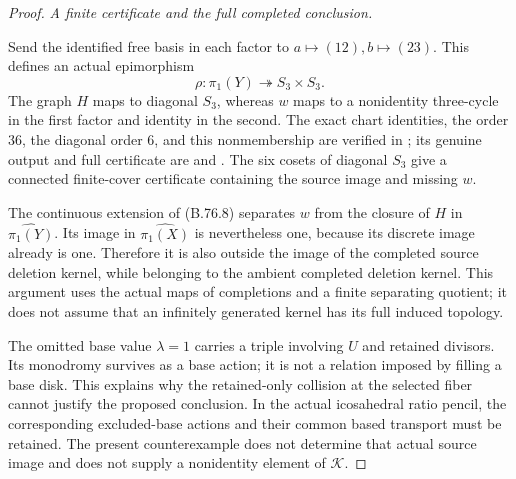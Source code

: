 \begin{proof}
\emph{A finite certificate and the full completed conclusion.}\par
Send the identified free basis in each factor to
\(a\mapsto(12),b\mapsto(23)\). This defines an actual
epimorphism
\[
              \rho:\pi_1(Y)\twoheadrightarrow S_3\times S_3.
 \tag{B.76.8}
\]
The graph \(H\) maps to diagonal \(S_3\), whereas \(w\) maps
to a nonidentity three-cycle in the first factor and identity
in the second. The exact chart identities, the order \(36\),
the diagonal order \(6\), and this nonmembership are verified in
; its
genuine output and full certificate are
 and
.
The six cosets of diagonal \(S_3\) give a connected finite-cover
certificate containing the source image and missing \(w\).

The continuous extension of (B.76.8) separates \(w\) from the
closure of \(H\) in \(\widehat{\pi_1(Y)}\). Its image in
\(\widehat{\pi_1(X)}\) is nevertheless one, because its
discrete image already is one. Therefore it is also outside the
image of the completed source deletion kernel, while belonging
to the ambient completed deletion kernel. This argument uses
the actual maps of completions and a finite separating quotient;
it does not assume that an infinitely generated kernel has its
full induced topology.

The omitted base value \(\lambda=1\) carries a triple involving
\(U\) and retained divisors. Its monodromy survives as a base
action; it is not a relation imposed by filling a base disk.
This explains why the retained-only collision at the selected
fiber cannot justify the proposed conclusion. In the actual
icosahedral ratio pencil, the corresponding excluded-base actions
and their common based transport must be retained. The present
counterexample does not determine that actual source image and
does not supply a nonidentity element of \(\mathcal K\).
\end{proof}
